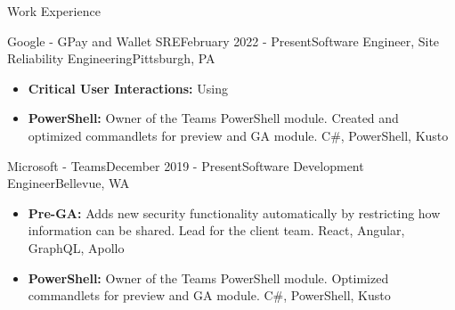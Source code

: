 \documentclass{resume} %
\begin{document}

\begin{rSection}{Work Experience}


\begin{rSubsection}{Google - GPay and Wallet SRE}{February 2022 - Present}{Software Engineer, Site Reliability Engineering}{Pittsburgh, PA}
\begin{itemize}
    \item \textbf{Critical User Interactions:} Using 
\end{itemize}
\begin{itemize}
    \item \textbf{PowerShell:} Owner of the Teams PowerShell module. Created and optimized commandlets for preview and GA module. C\#, PowerShell, Kusto
\end{itemize}
\end{rSubsection}


\begin{rSubsection}{Microsoft - Teams}{December 2019 - Present}{Software Development Engineer}{Bellevue, WA}
\begin{itemize}
    \item \textbf{Pre-GA:} Adds new security functionality automatically by restricting how information can be shared. Lead for the client team. React, Angular, GraphQL, Apollo
\end{itemize}
\begin{itemize}
    \item \textbf{PowerShell:} Owner of the Teams PowerShell module. Optimized commandlets for preview and GA module. C\#, PowerShell, Kusto
\end{itemize}
\end{rSubsection}



\end{rSection}
\end{document}
